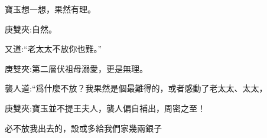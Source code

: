 \begin{parag}
    寶玉想一想，果然有理。\begin{note}庚雙夾:自然。\end{note}又道:“老太太不放你也難。”\begin{note}庚雙夾:第二層伏祖母溺愛，更是無理。\end{note}襲人道:“爲什麼不放？我果然是個最難得的，或者感動了老太太、太太，\begin{note}庚雙夾:寶玉並不提王夫人，襲人偏自補出，周密之至！\end{note}必不放我出去的，設或多給我們家幾兩銀子
\end{parag}
